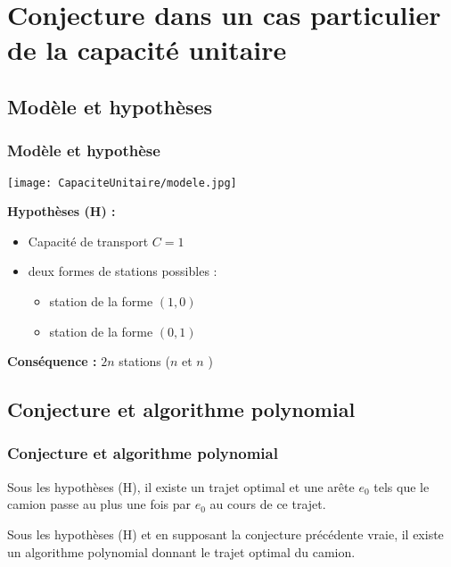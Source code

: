 \section{Conjecture dans un cas particulier de la capacité unitaire}

\subsection{Modèle et hypothèses}

\begin{frame}[label=CapaciteUnitaire]
  \frametitle{Modèle et hypothèse}
  
  \begin{center}
  
    \begin{minipage}[c]{.5\linewidth}
      \begin{center}
        \texttt{[image: CapaciteUnitaire/modele.jpg]}
      \end{center}
    \end{minipage}\hfill
    \begin{minipage}[c]{.5\linewidth}
      \textbf{Hypothèses (H) :}
      \begin{itemize}
      \item Capacité de transport $C=1$
      \item deux formes de stations possibles :
        \begin{itemize}
        \item station \plus de la forme $(1,0)$
        \item station \moins de la forme $(0,1)$
        \end{itemize}
      \end{itemize}
    \end{minipage}
  \end{center}
  \vfill
  \textbf{Conséquence :} $2n$ stations ($n$ \plus et $n$ \moins)
\end{frame}

\subsection{Conjecture et algorithme polynomial}

\begin{frame}
\frametitle{Conjecture et algorithme polynomial}

{
  \begin{conj} \label{conj: capacité unitaire - un passage}
  Sous les hypothèses (H), il existe un trajet optimal et une arête $e_0$ tels que le camion passe au plus une fois par $e_0$ au cours de ce trajet.
  \end{conj}
}
{
  \begin{thm} \label{thm: capacité unitaire - optimalité}
  Sous les hypothèses (H) et en supposant la conjecture précédente vraie, il existe un algorithme polynomial donnant le trajet optimal du camion.
  \end{thm}
}
\end{frame}

